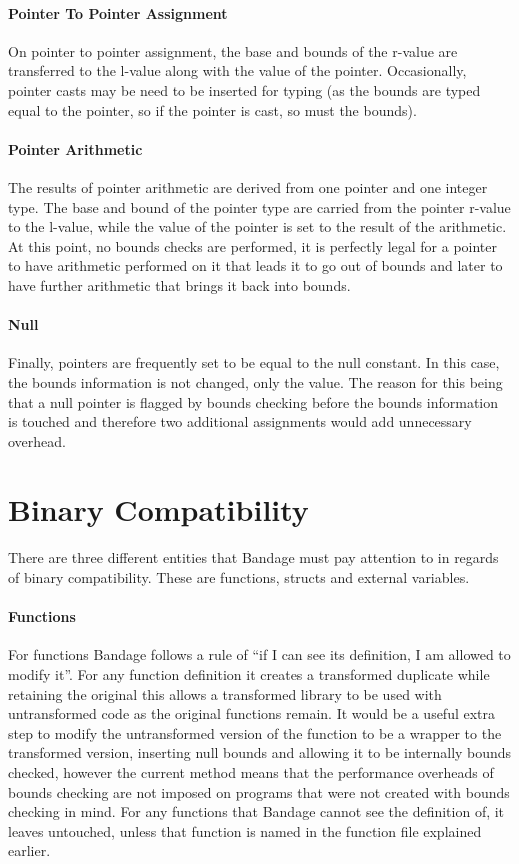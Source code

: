 \paragraph{Pointer To Pointer Assignment}
On pointer to pointer assignment, the base and bounds of the r-value are transferred to the l-value along with the value of the pointer.
Occasionally, pointer casts may be need to be inserted for typing (as the bounds are typed equal to the pointer, so if the pointer is cast, so must the bounds).

\paragraph{Pointer Arithmetic}
The results of pointer arithmetic are derived from one pointer and one integer type.
The base and bound of the pointer type are carried from the pointer r-value to the l-value, while the value of the pointer is set to the result of the arithmetic.
At this point, no bounds checks are performed, it is perfectly legal for a pointer to have arithmetic performed on it that leads it to go out of bounds and later to have further arithmetic that brings it back into bounds.

\paragraph{Null}
Finally, pointers are frequently set to be equal to the null constant.
In this case, the bounds information is not changed, only the value.
The reason for this being that a null pointer is flagged by bounds checking before the bounds information is touched and therefore two additional assignments would add unnecessary overhead.

\section{Binary Compatibility}

There are three different entities that Bandage must pay attention to in regards of binary compatibility.
These are functions, structs and external variables.

\paragraph{Functions}
For functions Bandage follows a rule of ``if I can see its definition, I am allowed to modify it''.
For any function definition it creates a transformed duplicate while retaining the original this allows a transformed library to be used with untransformed code as the original functions remain.
It would be a useful extra step to modify the untransformed version of the function to be a wrapper to the transformed version, inserting null bounds and allowing it to be internally bounds checked, however the current method means that the performance overheads of bounds checking are not imposed on programs that were not created with bounds checking in mind.
For any functions that Bandage cannot see the definition of, it leaves untouched, unless that function is named in the function file explained earlier.

